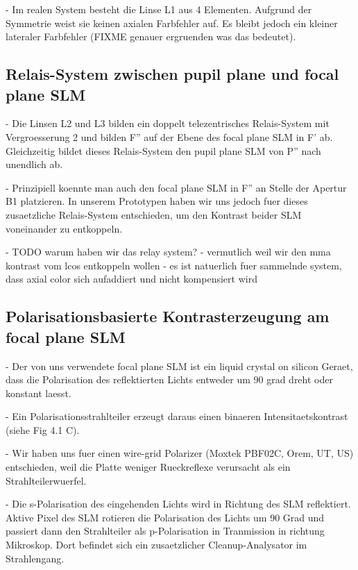   - Im realen System besteht die Linse L1 aus 4 Elementen. Aufgrund
    der Symmetrie weist sie keinen axialen Farbfehler auf. Es bleibt
    jedoch ein kleiner lateraler Farbfehler (FIXME genauer ergruenden
    was das bedeutet).
 

\subsection{ Relais-System zwischen pupil plane und focal plane SLM}
  - Die Linsen L2 und L3 bilden ein doppelt telezentrisches             %
    Relais-System mit Vergroesserung 2 und bilden F'' auf der Ebene
    des focal plane SLM in F' ab. Gleichzeitig bildet dieses
    Relais-System den pupil plane SLM von P'' nach unendlich ab.
 
  - Prinzipiell koennte man auch den focal plane SLM in F'' an Stelle
    der Apertur B1 platzieren. In unserem Prototypen haben wir uns
    jedoch fuer dieses zusaetzliche Relais-System entschieden, um den
    Kontrast beider SLM voneinander zu entkoppeln.

   - TODO warum haben wir das relay system? 
     - vermutlich weil wir den mma kontrast vom lcos entkoppeln wollen
     - es ist natuerlich fuer sammelnde system, dass axial color sich
       aufaddiert und nicht kompensiert wird


\subsection{ Polarisationsbasierte Kontrasterzeugung am focal plane SLM}
  - Der von uns verwendete focal plane SLM ist ein liquid crystal on
    silicon Geraet, dass die Polarisation des reflektierten Lichts
    entweder um 90 grad dreht oder konstant laesst.
 
  - Ein Polarisationsstrahlteiler erzeugt daraus einen binaeren
    Intensitaetskontrast (siehe Fig 4.1 C).

  - Wir haben uns fuer einen wire-grid Polarizer (Moxtek PBF02C, Orem,
    UT, US) entschieden, weil die Platte weniger Rueckreflexe
    verursacht als ein Strahlteilerwuerfel.

  - Die s-Polarisation des eingehenden Lichts wird in Richtung des SLM
    reflektiert. Aktive Pixel des SLM rotieren die Polarisation des
    Lichts um 90 Grad und passiert dann den Strahlteiler als
    p-Polarisation in Tranmission in richtung Mikroskop. Dort befindet
    sich ein zusaetzlicher Cleanup-Analysator im Strahlengang.
 
